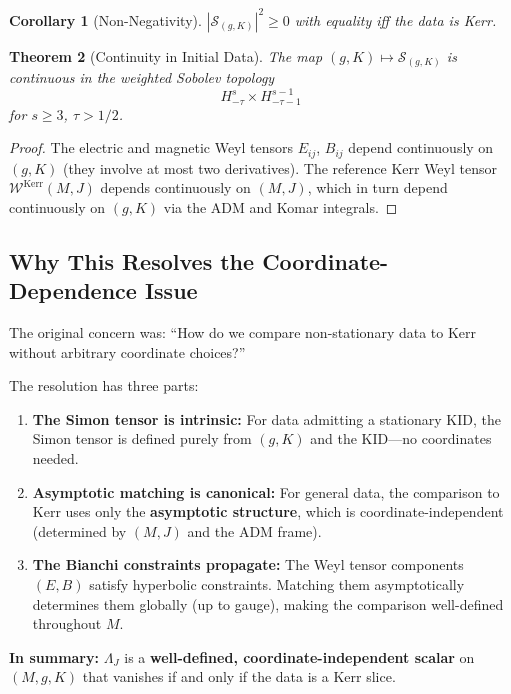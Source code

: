 \documentclass[12pt]{article}
\theoremstyle{plain}
\newtheorem{theorem}{Theorem}[section]
\newtheorem{corollary}[theorem]{Corollary}
\theoremstyle{definition}
\theoremstyle{remark}
\begin{document}
\begin{corollary}[Non-Negativity]\label{cor:nonneg}
$|\mathcal{S}_{(g,K)}|^2 \geq 0$ with equality iff the data is Kerr.
\end{corollary}

\begin{theorem}[Continuity in Initial Data]\label{thm:continuity}
The map $(g, K) \mapsto \mathcal{S}_{(g,K)}$ is continuous in the weighted Sobolev topology 
\[
H^s_{-\tau} \times H^{s-1}_{-\tau-1}
\]
for $s \geq 3$, $\tau > 1/2$.
\end{theorem}

\begin{proof}
The electric and magnetic Weyl tensors $E_{ij}$, $B_{ij}$ depend continuously on $(g, K)$ (they involve at most two derivatives). The reference Kerr Weyl tensor $\mathcal{W}^{\mathrm{Kerr}}(M, J)$ depends continuously on $(M, J)$, which in turn depend continuously on $(g, K)$ via the ADM and Komar integrals.
\end{proof}

\subsection{Why This Resolves the Coordinate-Dependence Issue}

The original concern was: ``How do we compare non-stationary data to Kerr without arbitrary coordinate choices?''

The resolution has three parts:
\begin{enumerate}
    \item \textbf{The Simon tensor is intrinsic:} For data admitting a stationary KID, the Simon tensor is defined purely from $(g, K)$ and the KID---no coordinates needed.
    
    \item \textbf{Asymptotic matching is canonical:} For general data, the comparison to Kerr uses only the \textbf{asymptotic structure}, which is coordinate-independent (determined by $(M, J)$ and the ADM frame).
    
    \item \textbf{The Bianchi constraints propagate:} The Weyl tensor components $(E, B)$ satisfy hyperbolic constraints. Matching them asymptotically determines them globally (up to gauge), making the comparison well-defined throughout $M$.
\end{enumerate}

\textbf{In summary:} $\Lambda_J$ is a \textbf{well-defined, coordinate-independent scalar} on $(M, g, K)$ that vanishes if and only if the data is a Kerr slice.
\end{document}
